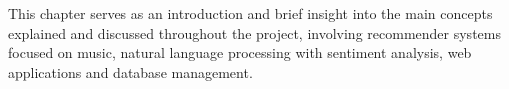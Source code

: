 This chapter serves as an introduction and brief insight into the main concepts explained and discussed throughout the project, involving recommender systems focused on music, natural language processing with sentiment analysis, web applications and database management.